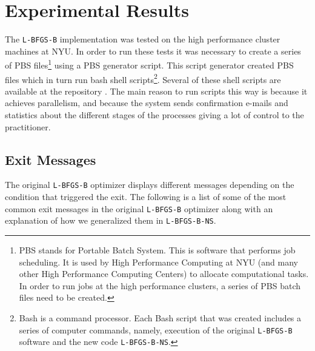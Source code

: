 \chapter{Experimental Results}

The \texttt{L-BFGS-B} implementation was tested on the high performance cluster machines at NYU. In order to run these tests it was necessary to create a series of PBS files\footnote{PBS stands for Portable Batch System. This is software that performs job scheduling. It is used by High Performance Computing at NYU (and many other High Performance Computing Centers) to allocate computational tasks. In order to run jobs at the high performance clusters, a series of PBS batch files need to be created.} using a PBS generator script. This script generator created PBS files which in turn run bash shell scripts\footnote{Bash is a command processor. Each Bash script that was created includes a series of computer commands, namely, execution of the original \texttt{L-BFGS-B} software and the new code \texttt{L-BFGS-B-NS}.}. Several of these shell scripts are available at the repository \citep{lbfgsbNS}. The main reason to run scripts this way is because it achieves parallelism, and because the system sends confirmation e-mails and statistics about the different stages of the processes giving a lot of control to the practitioner.

\section{Exit Messages}

The original \texttt{L-BFGS-B} optimizer displays different messages depending on the condition that triggered the exit. The following is a list of some of the most common exit messages in the original \texttt{L-BFGS-B} optimizer along with an explanation of how we generalized them in \texttt{L-BFGS-B-NS}.


